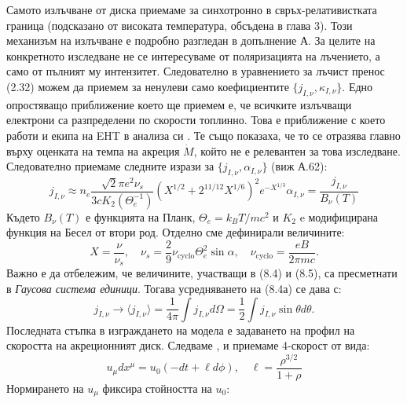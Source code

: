 \documentclass[12pt]{article}
\numberwithin{equation}{section}
\numberwithin{figure}{section}
\begin{document}
	Самото излъчване от диска приемаме за синхотронно в свръх-релативистката граница (подсказано от високата температура, обсъдена в глава 3). Този механизъм на излъчване е подробно разгледан в допълнение А. За целите на конкретното изследване не се интересуваме от поляризацията на лъчението, а само от пълният му интензитет. Следователно в уравнението за лъчист пренос (2.32) можем да приемем за ненулеви само коефициентите $\{j_{I,\nu}, \kappa_{I,\nu}\}.$ Едно опростяващо приближение което ще приемем е, че всичките излъчващи електрони са разпределени по скорости топлинно. Това е приближение с което работи и екипа на EHT в анализа си \cite{EHT_M87_VIII}. Те също показаха, че то се отразява главно върху оценката на темпа на акреция $\dot{M}$, който не е релевантен за това изследване. Следователно приемаме следните изрази за $\{j_{I,\nu}, \alpha_{I,\nu}\}$ (виж А.62):
	\begin{subequations}
		\begin{equation}
			j_{I,\nu}\approx n_e \frac{\sqrt{2}\pi e^2\nu_s}{3cK_2(\Theta_e^{-1})}\left(X^{1/2} + 2^{11/12}X^{1/6}\right)^2 e^{-X^{1/3}}
		\end{equation}
		\begin{equation}
			\alpha_{I,\nu} = \frac{j_{I,\nu}}{B_\nu(T)}
		\end{equation}
	\end{subequations}
	Където $B_\nu(T)$ е функцията на Планк, $\Theta_e = k_BT/mc^2$ и $K_2$ e модифицирана функция на Бесел от втори род. Отделно сме дефинирали величините:
	\begin{equation}
		X = \frac{\nu}{\nu_s},\quad \nu_s = \frac{2}{9}\nu_\text{cyclo}\Theta_e^2\sin\alpha, \quad \nu_\text{cyclo} = \frac{eB}{2\pi m c}.
	\end{equation}
	Важно е да отбележим, че величините, участващи в (8.4) и (8.5), са пресметнати в \emph{Гаусова система единици}. Тогава усредняването на (8.4а) се дава с:
	\begin{equation}
		j_{I,\nu}\rightarrow\langle j_{I,\nu} \rangle = \frac{1}{4\pi}\int j_{I,\nu} d\Omega = \frac{1}{2}\int j_{I,\nu} \sin\theta d\theta.
	\end{equation}
	Последната стъпка в изграждането на модела е задаването на профил на скоростта на акреционният диск. Следваме \cite{Broderick2021}, \cite{Gold2020} и приемаме 4-скорост от вида:
	\begin{equation}
		u_\mu dx^\mu = u_0(-dt + \ell d\phi),\quad \ell = \frac{\rho^{3/2}}{1 +\rho}
	\end{equation}
	Нормирането на $u_\mu$ фиксира стойността на $u_0$:
\end{document}
